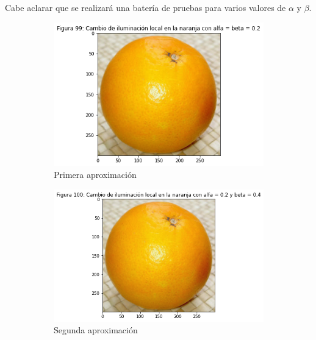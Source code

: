 \documentclass[11pt,twoside,titlepage,a4paper]{article}
\numberwithin{equation}{section} %
\theoremstyle{usual}
\begin{document}
Cabe aclarar que se realizará una batería de pruebas para varios valores de $\alpha$ y $\beta$.

\begin{figure}[h]
    \centering
    \begin{subfigure}[b]{.43\textwidth}
        \centering
        \includegraphics[width=\textwidth]{imagenes/PoissonImageEditing_cell_103_output_0.png}
        \caption{Primera aproximación}
        \label{fig:Naranja1Aprox}
    \end{subfigure}%
    \centering
    \begin{subfigure}[b]{.47\textwidth}
        \centering
        \includegraphics[width=\textwidth]{imagenes/PoissonImageEditing_cell_103_output_1.png}
        \caption{Segunda aproximación}
        \label{fig:Naranja2Aprox}%
    \end{subfigure}
    \centering
    \begin{subfigure}[b]{.45\textwidth}

\end{subfigure}
\end{figure}
\end{document}
